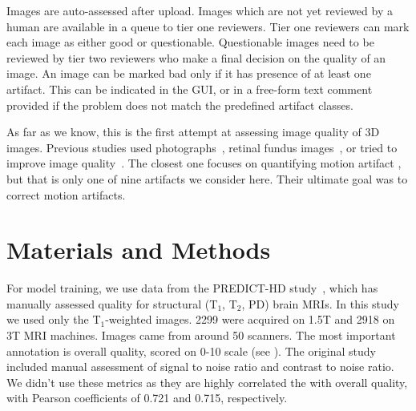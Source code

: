 \documentclass{midl} %
\begin{document}
Images are auto-assessed after upload.
Images which are not yet reviewed by a human are available in a queue to tier one reviewers.
Tier one reviewers can mark each image as either good or questionable. Questionable images need to be reviewed by tier two reviewers who make a final decision on the quality of an image. An image can be marked bad only if it has presence of at least one artifact. This can be indicated in the GUI, or in a free-form text comment provided if the problem does not match the predefined artifact classes.

As far as we know, this is the first attempt at assessing image quality of 3D images. Previous studies used photographs~\cite{bosse2017deep,hosu2020koniq}, retinal fundus images~\cite{yu2017image},
or tried to improve image quality~\cite{higaki2019improvement}. The closest one focuses on quantifying motion artifact \cite{butskova2021adversarial}, but that is only one of nine artifacts we consider here. Their ultimate goal was to correct motion artifacts. %

\section{Materials and Methods}

For model training, we use data from the PREDICT-HD study~\cite{paulsen2014clinical}, which has manually assessed quality for structural (T$_1$, T$_2$, PD) brain MRIs. In this study we used only the T$_1$-weighted images. 2299 were acquired on 1.5T and 2918 on 3T MRI machines. Images came from around 50 scanners.
The most important annotation is overall quality, scored on 0-10 scale (see ). The original study included manual assessment of signal to noise ratio and contrast to noise ratio. We didn't use these metrics as they are highly correlated the with overall quality, with Pearson coefficients of 0.721 and 0.715, respectively.
\end{document}
